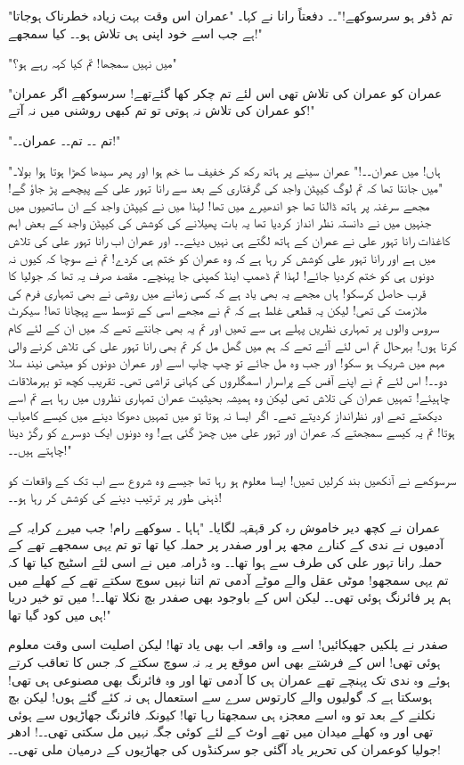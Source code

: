 "تم ڈفر ہو سرسوکھے!"۔۔ دفعتاً رانا نے کہا۔ "عمران اس وقت بہت زیادہ خطرناک ہوجاتا ہے جب اسے خود اپنی ہی تلاش ہو۔۔ کیا سمجھے!"

"میں نہیں سمجھا! تم کیا کہہ رہے ہو؟"

"عمران کو عمران کی تلاش تھی اس لئے تم چکر کھا گئےتھے! سرسوکھے اگر عمران کو عمران کی تلاش نہ ہوتی تو تم کبھی روشنی میں نہ آتے!"

"تم ۔۔ تم۔۔ عمران۔۔!"

"ہاں! میں عمران۔۔!" عمران سینے پر ہاتھ رکھ کر خفیف سا خم ہوا اور پھر سیدھا کھڑا ہوتا ہوا بولا۔ "میں جانتا تھا کہ تم لوگ کیپٹن واجد کی گرفتاری کے بعد سے رانا تہور علی کے پیچھے پڑ جاؤ گے! مجھے سرغنہ پر ہاتھ ڈالنا تھا جو اندھیرے میں تھا! لہذا میں نے کیپٹن واجد کے ان ساتھیوں میں جنہیں میں نے دانستہ نظر انداز کردیا تھا یہ بات پھیلانے کی کوشش کی کیپٹن واجد کے بعض اہم کاغذات رانا تہور علی نے عمران کے ہاتھ لگتے ہی نہیں دیئے۔۔ اور عمران اب رانا تہور علی کی تلاش میں ہے اور رانا تہور علی کوشش کر رہا ہے کہ وہ عمران کو ختم ہی کردے! تم نے سوچا کہ کیوں نہ دونوں ہی کو ختم کردیا جائے! لہذا تم ڈھمپ اینڈ کمپنی جا پہنچے۔ مقصد صرف یہ تھا کہ جولیا کا قرب حاصل کرسکو! ہاں مجھے یہ بھی یاد ہے کہ کسی زمانے میں روشی نے بھی تمہاری فرم کی ملازمت کی تھی! لیکن یہ قطعی غلط ہے کہ تم نے مجھے اسی کے توسط سے پہچانا تھا! سیکرٹ سروس والوں پر تمہاری نظریں پہلے ہی سے تھیں اور تم یہ بھی جانتے تھے کہ میں ان کے لئے کام کرتا ہوں! بہرحال تم اس لئے آئے تھے کہ ہم میں گھل مل کر تم بھی رانا تہور علی کی تلاش کرنے والی مہم میں شریک ہو سکو! اور جب وہ مل جائے تو چپ چاپ اسے اور عمران دونوں کو میٹھی نیند سلا دو۔۔! اس لئے تم نے اپنے آفس کے پراسرار اسمگلروں کی کہانی تراشی تھی۔ تقریب کچھ تو بہرملاقات چاہیئے! تمہیں عمران کی تلاش تھی لیکن وہ ہمیشہ بحیثیت عمران تمہاری نظروں میں رہا ہے تم اسے دیکھتے تھے اور نظرانداز کردیتے تھے۔ اگر ایسا نہ ہوتا تو میں تمہیں دھوکا دینے میں کیسے کامیاب ہوتا! تم یہ کیسے سمجھتے کہ عمران اور تہور علی میں چھڑ گئی ہے! وہ دونوں ایک دوسرے کو رگڑ دینا چاہتے ہیں۔۔!"

سرسوکھے نے آنکھیں بند کرلیں تھیں! ایسا معلوم ہو رہا تھا جیسے وہ شروع سے اب تک کے واقعات کو ذہنی طور پر ترتیب دینے کی کوشش کر رہا ہو۔۔!

عمران نے کچھ دیر خاموش رہ کر قہقہہ لگایا۔ "ہاہا ۔ سوکھے رام! جب میرے کرایہ کے آدمیوں نے ندی کے کنارے مجھ پر اور صفدر پر حملہ کیا تھا تو تم یہی سمجھے تھے کے حملہ رانا تہور علی کی طرف سے ہوا تھا۔۔ وہ ڈرامہ میں نے اسی لئے اسٹیج کیا تھا کہ تم یہی سمجھو! موٹی عقل والے موٹے آدمی تم اتنا نہیں سوچ سکتے تھے کے کھلے میں ہم پر فائرنگ ہوئی تھی۔۔ لیکن اس کے باوجود بھی صفدر بچ نکلا تھا۔۔! میں تو خیر دریا ہی میں کود گیا تھا!"

صفدر نے پلکیں جھپکائیں! اسے وہ واقعہ اب بھی یاد تھا! لیکن اصلیت اسی وقت معلوم ہوئی تھی! اس کے فرشتے بھی اس موقع پر یہ نہ سوچ سکتے کہ جس کا تعاقب کرتے ہوئے وہ ندی تک پہنچے تھے عمران ہی کا آدمی تھا اور وہ فائرنگ بھی مصنوعی ہی تھی! ہوسکتا ہے کہ گولیوں والے کارتوس سرے سے استعمال ہی نہ کئے گئے ہوں! لیکن بچ نکلنے کے بعد تو وہ اسے معجزہ ہی سمجھتا رہا تھا! کیونکہ فائرنگ جھاڑیوں سے ہوئی تھی اور وہ کھلے میدان میں تھے اوٹ کے لئے کوئی جگہ نہیں مل سکتی تھی۔۔! ادھر جولیا کوعمران کی تحریر یاد آگئی جو سرکنڈوں کی جھاڑیوں کے درمیان ملی تھی۔۔!

